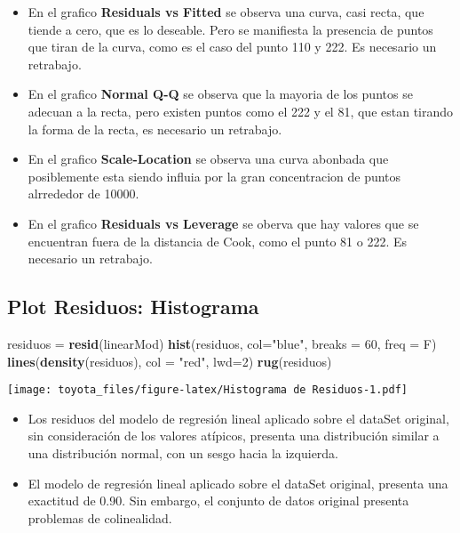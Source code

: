 \documentclass[]{article}
\newenvironment{Shaded}{\begin{snugshade}}{\end{snugshade}}
\newcommand{\DataTypeTok}[1]{\textcolor[rgb]{0.13,0.29,0.53}{#1}}
\newcommand{\DecValTok}[1]{\textcolor[rgb]{0.00,0.00,0.81}{#1}}
\newcommand{\KeywordTok}[1]{\textcolor[rgb]{0.13,0.29,0.53}{\textbf{#1}}}
\newcommand{\NormalTok}[1]{#1}
\newcommand{\StringTok}[1]{\textcolor[rgb]{0.31,0.60,0.02}{#1}}
\providecommand{\tightlist}{%
  \setlength{\itemsep}{0pt}\setlength{\parskip}{0pt}}
\begin{document}
\begin{itemize}
\tightlist
\item
  En el grafico \textbf{Residuals vs Fitted} se observa una curva, casi
  recta, que tiende a cero, que es lo deseable. Pero se manifiesta la
  presencia de puntos que tiran de la curva, como es el caso del punto
  110 y 222. Es necesario un retrabajo.\\
\item
  En el grafico \textbf{Normal Q-Q} se observa que la mayoria de los
  puntos se adecuan a la recta, pero existen puntos como el 222 y el 81,
  que estan tirando la forma de la recta, es necesario un retrabajo.\\
\item
  En el grafico \textbf{Scale-Location} se observa una curva abonbada
  que posiblemente esta siendo influia por la gran concentracion de
  puntos alrrededor de 10000.\\
\item
  En el grafico \textbf{Residuals vs Leverage} se oberva que hay valores
  que se encuentran fuera de la distancia de Cook, como el punto 81 o
  222. Es necesario un retrabajo.
\end{itemize}

\hypertarget{plot-residuos-histograma}{%
\subsection{Plot Residuos: Histograma}\label{plot-residuos-histograma}}

\begin{Shaded}
\begin{Highlighting}[]
\NormalTok{residuos =}\StringTok{ }\KeywordTok{resid}\NormalTok{(linearMod)}
\KeywordTok{hist}\NormalTok{(residuos, }\DataTypeTok{col=}\StringTok{"blue"}\NormalTok{, }\DataTypeTok{breaks =} \DecValTok{60}\NormalTok{, }\DataTypeTok{freq =}\NormalTok{ F)}
\KeywordTok{lines}\NormalTok{(}\KeywordTok{density}\NormalTok{(residuos), }\DataTypeTok{col =} \StringTok{"red"}\NormalTok{, }\DataTypeTok{lwd=}\DecValTok{2}\NormalTok{)}
\KeywordTok{rug}\NormalTok{(residuos)}
\end{Highlighting}
\end{Shaded}

\texttt{[image: toyota\_files/figure-latex/Histograma de Residuos-1.pdf]}

\begin{itemize}
\item
  Los residuos del modelo de regresión lineal aplicado sobre el dataSet
  original, sin consideración de los valores atípicos, presenta una
  distribución similar a una distribución normal, con un sesgo hacia la
  izquierda.
\item
  El modelo de regresión lineal aplicado sobre el dataSet original,
  presenta una exactitud de 0.90. Sin embargo, el conjunto de datos
  original presenta problemas de colinealidad.
\end{itemize}
\end{document}
